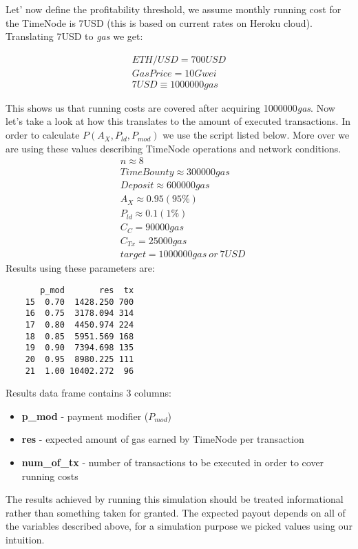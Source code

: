 \documentclass{article}
\begin{document}
  Let' now define the profitability threshold, we assume monthly running cost for the TimeNode is 7USD (this is based on current rates on Heroku cloud). Translating 7USD to \textit{gas} we get:
  
  \begin{align*}
  ETH/USD=700USD\\
  Gas Price = 10Gwei\\
  7USD \equiv 1000000gas
  \end{align*}
  
  This shows us that running costs are covered after acquiring 1000000\textit{gas}. Now let's take a look at how this translates to the amount of executed transactions. In order to calculate $P(A_{X}, P_{ld}, P_{mod})$ we use the script listed below. More over we are using these values describing TimeNode operations and network conditions.
  \begin{align*}
  &n \approx 8\\
  &TimeBounty \approx 300000gas\\
  &Deposit \approx 600000gas\\
  &A_{X} \approx 0.95 (95\%)\\
  &P_{ld} \approx 0.1 (1\%)\\
  &C_{C} = 90000gas\\
  &C_{Tx} = 25000gas\\
  &target = 1000000gas~or~7USD
  \end{align*}
  Results using these parameters are:
  \begin{verbatim}
       p_mod       res  tx
    15  0.70  1428.250 700
    16  0.75  3178.094 314
    17  0.80  4450.974 224
    18  0.85  5951.569 168
    19  0.90  7394.698 135
    20  0.95  8980.225 111
    21  1.00 10402.272  96
  \end{verbatim}
  Results data frame contains 3 columns:
  \begin{itemize}
  \item \textbf{p\_mod} - payment modifier ($P_{mod}$)
  \item \textbf{res} - expected amount of gas earned by TimeNode per transaction
  \item \textbf{num\_of\_tx} - number of transactions to be executed in order to cover running costs
  \end{itemize}
  
  The results achieved by running this simulation should be treated informational rather than something taken for granted. The expected payout depends on all of the variables described above, for a simulation purpose we picked values using our intuition.
  
\end{document}
